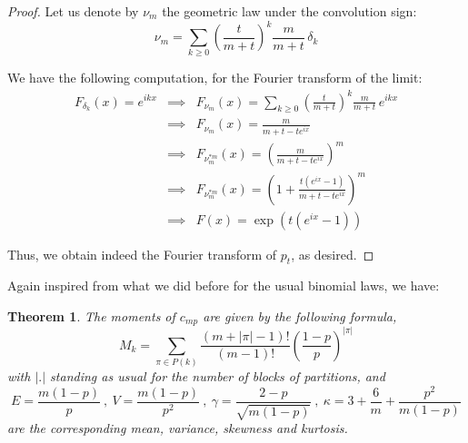 \documentclass[12pt]{amsbook}
\newtheorem{theorem}{Theorem}[chapter]
\begin{document}
\begin{proof}
Let us denote by $\nu_m$ the geometric law under the convolution sign:
$$\nu_m=\sum_{k\geq0}\left(\frac{t}{m+t}\right)^k\frac{m}{m+t}\,\delta_k$$

We have the following computation, for the Fourier transform of the limit: 
\begin{eqnarray*}
F_{\delta_k}(x)=e^{ikx}
&\implies&F_{\nu_m}(x)=\sum_{k\geq0}\left(\frac{t}{m+t}\right)^k\frac{m}{m+t}\,e^{ikx}\\
&\implies&F_{\nu_m}(x)=\frac{m}{m+t-te^{ix}}\\
&\implies&F_{\nu_m^{*m}}(x)=\left(\frac{m}{m+t-te^{ix}}\right)^m\\
&\implies&F_{\nu_m^{*m}}(x)=\left(1+\frac{t(e^{ix}-1)}{m+t-te^{ix}}\right)^m\\
&\implies&F(x)=\exp\left(t(e^{ix}-1)\right)
\end{eqnarray*}

Thus, we obtain indeed the Fourier transform of $p_t$, as desired.
\end{proof}

Again inspired from what we did before for the usual binomial laws, we have:

\begin{theorem}
The moments of $c_{mp}$ are given by the following formula,
$$M_k=\sum_{\pi\in P(k)}\frac{(m+|\pi|-1)!}{(m-1)!}\left(\frac{1-p}{p}\right)^{|\pi|}$$
with $|.|$ standing as usual for the number of blocks of partitions, and 
$$E=\frac{m(1-p)}{p}\ ,\  V=\frac{m(1-p)}{p^2}\ ,\ \gamma=\frac{2-p}{\sqrt{m(1-p)}}\ ,\ \kappa=3+\frac{6}{m}+\frac{p^2}{m(1-p)}$$
are the corresponding mean, variance, skewness and kurtosis.
\end{theorem}
\end{document}
